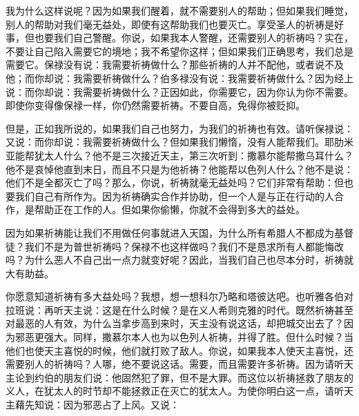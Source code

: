 我为什么这样说呢？因为如果我们醒着，就不需要别人的帮助；但如果我们睡觉，别人的帮助对我们毫无益处，即使有这帮助我们也要灭亡。享受圣人的祈祷是好事，但也要我们自己警醒。你说，如果我本人警醒，还需要别人的祈祷吗？实在，不要让自己陷入需要它的境地；我不希望你这样；但如果我们正确思考，我们总是需要它。保禄没有说：我需要祈祷做什么？那些祈祷的人并不配他，或者说不及他；而你却说：我需要祈祷做什么？伯多禄没有说：我需要祈祷做什么？因为经上说：而你却说：我需要祈祷做什么？正因如此，你需要它，因为你认为你不需要。即使你变得像保禄一样，你仍然需要祈祷。不要自高，免得你被贬抑。\par

但是，正如我所说的，如果我们自己也努力，为我们的祈祷也有效。请听保禄说：又说：而你却说：我需要祈祷做什么？但如果我们懒惰，没有人能帮我们。耶肋米亚能帮犹太人什么？他不是三次接近天主，第三次听到：撒慕尔能帮撒乌耳什么？他不是哀悼他直到末日，而且不只是为他祈祷？他能帮以色列人什么？他不是说：他们不是全都灭亡了吗？那么，你说，祈祷就毫无益处吗？它们非常有帮助：但也要我们自己有所作为。因为祈祷确实合作并协助，但一个人是与正在行动的人合作，是帮助正在工作的人。但如果你偷懒，你就不会得到多大的益处。\par

因为如果祈祷能让我们不用做任何事就进入天国，为什么所有希腊人不都成为基督徒？我们不是为普世祈祷吗？保禄不也这样做吗？我们不是恳求所有人都能悔改吗？为什么恶人不自己出一点力就变好呢？因此，当我们自己也尽本分时，祈祷就大有助益。\par

你愿意知道祈祷有多大益处吗？我想，想一想科尔乃略和塔彼达吧。也听雅各伯对拉班说：再听天主说：这是在什么时候？是在义人希则克雅的时代。既然祈祷甚至对最恶的人有效，为什么当拿步高到来时，天主没有说这话，却把城交出去了？因为邪恶更强大。同样，撒慕尔本人也为以色列人祈祷，并得了胜。但什么时候？当他们也使天主喜悦的时候，他们就打败了敌人。你说，如果我本人使天主喜悦，还需要别人的祈祷吗？人哪，绝不要说这话。需要，而且需要许多祈祷。因为请听天主论到约伯的朋友们说：他固然犯了罪，但不是大罪。而这位以祈祷拯救了朋友的义人，在犹太人的时节却不能拯救正在灭亡的犹太人。为使你明白这一点，请听天主藉先知说：因为邪恶占了上风。又说：\par

